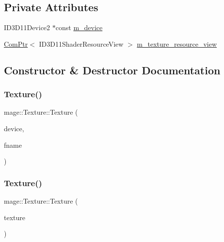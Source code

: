 \subsection*{Private Attributes}
\begin{DoxyCompactItemize}
\item 
I\+D3\+D11\+Device2 $\ast$const \hyperlink{classmage_1_1_texture_ad5409f37b321649bc1a12bcee8eb661b}{m\+\_\+device}
\item 
\hyperlink{namespacemage_ae74f374780900893caa5555d1031fd79}{Com\+Ptr}$<$ I\+D3\+D11\+Shader\+Resource\+View $>$ \hyperlink{classmage_1_1_texture_a3de1d2d744e7bb276b0f66d72640e423}{m\+\_\+texture\+\_\+resource\+\_\+view}
\end{DoxyCompactItemize}


\subsection{Constructor \& Destructor Documentation}
\hypertarget{classmage_1_1_texture_a680c4df56476b4c66c1e2ffd5bef63c2}{}\label{classmage_1_1_texture_a680c4df56476b4c66c1e2ffd5bef63c2} 
\subsubsection{\texorpdfstring{Texture()}{Texture()}\hspace{0.1cm}{\footnotesize\ttfamily [1/3]}}
{\footnotesize\ttfamily mage\+::\+Texture\+::\+Texture (\begin{DoxyParamCaption}\item[{I\+D3\+D11\+Device2 $\ast$}]{device,  }\item[{const wstring \&}]{fname }\end{DoxyParamCaption})\hspace{0.3cm}{\ttfamily [explicit]}}

\hypertarget{classmage_1_1_texture_aed9e8ab5bc3efdeb381672fd4e243ea7}{}\label{classmage_1_1_texture_aed9e8ab5bc3efdeb381672fd4e243ea7} 
\subsubsection{\texorpdfstring{Texture()}{Texture()}\hspace{0.1cm}{\footnotesize\ttfamily [2/3]}}
{\footnotesize\ttfamily mage\+::\+Texture\+::\+Texture (\begin{DoxyParamCaption}\item[{const \hyperlink{classmage_1_1_texture}{Texture} \&}]{texture }\end{DoxyParamCaption})\hspace{0.3cm}{\ttfamily [delete]}}

